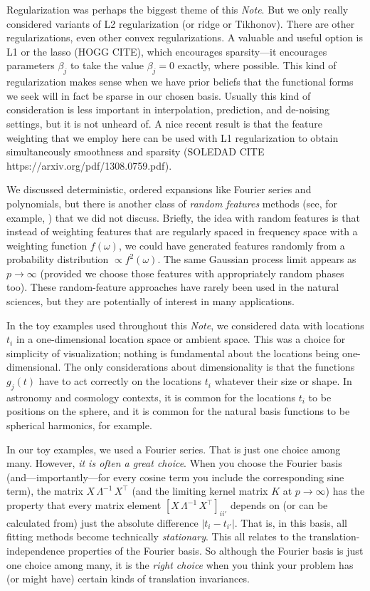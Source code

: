\documentclass[12pt,letterpaper]{article}
\newcommand{\documentname}{\textsl{Note}}
\begin{document}
Regularization was perhaps the biggest theme of this \documentname.
But we only really considered variants of L2 regularization (or ridge or Tikhonov).
There are other regularizations, even other convex regularizations.
A valuable and useful option is L1 or the lasso (HOGG CITE), which encourages sparsity---it encourages parameters $\beta_j$ to take the value $\beta_j=0$ exactly, where possible.
This kind of regularization makes sense when we have prior beliefs that the functional forms we seek will in fact be sparse in our chosen basis.
Usually this kind of consideration is less important in interpolation, prediction, and de-noising settings, but it is not unheard of.
A nice recent result is that the feature weighting that we employ here can be used with L1 regularization to obtain simultaneously smoothness and sparsity (SOLEDAD CITE https://arxiv.org/pdf/1308.0759.pdf).

We discussed deterministic, ordered expansions like Fourier series and polynomials, but there is another class of \emph{random features} methods (see, for example, \citealt{rahimi2007random}) that we did not discuss.
Briefly, the idea with random features is that instead of weighting features that are regularly spaced in frequency space with a weighting function $f(\omega)$, we could have generated features randomly from a probability distribution $\propto f^2(\omega)$.
The same Gaussian process limit appears as $p\rightarrow\infty$ (provided we choose those features with appropriately random phases too).
These random-feature approaches have rarely been used in the natural sciences, but they are potentially of interest in many applications.

In the toy examples used throughout this \documentname, we considered data with locations $t_i$ in a one-dimensional location space or ambient space.
This was a choice for simplicity of visualization; nothing is fundamental about the locations being one-dimensional.
The only considerations about dimensionality is that the functions $g_j(t)$ have to act correctly on the locations $t_i$ whatever their size or shape.
In astronomy and cosmology contexts, it is common for the locations $t_i$ to be positions on the sphere, and it is common for the natural basis functions to be spherical harmonics, for example.

In our toy examples, we used a Fourier series.
That is just one choice among many.
However, \emph{it is often a great choice}.
When you choose the Fourier basis (and---importantly---for every cosine term you include the corresponding sine term), the matrix $X\,\Lambda^{-1}\,X^\top$ (and the limiting kernel matrix $K$ at $p\rightarrow\infty$) has the property that every matrix element $[X\,\Lambda^{-1}\,X^\top]_{ii'}$ depends on (or can be calculated from) just the absolute difference $|t_i-t_{i'}|$.
That is, in this basis, all fitting methods become technically \emph{stationary}.
This all relates to the translation-independence properties of the Fourier basis.
So although the Fourier basis is just one choice among many, it is the \emph{right choice} when you think your problem has (or might have) certain kinds of translation invariances.
\end{document}
